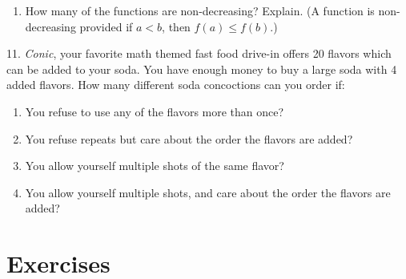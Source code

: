 \documentclass[10pt,]{book}
\theoremstyle{plain}
\theoremstyle{definition}
\numberwithin{equation}{chapter}
\newcommand{\lt}{ < }
\begin{document}
\begin{exerciselist}
\begin{enumerate}[label=(\alph*)]
\item\hypertarget{li-345}{}
              How many of the functions are non-decreasing? Explain. (A function is non-decreasing provided if \(a \lt  b\), then \(f(a) \le f(b)\).)


\end{enumerate}

\par\smallskip
\item[11.]\hypertarget{exercise-105}{}
                \emph{Conic}, your favorite math themed fast food drive-in offers 20 flavors which can be added to your soda. You have enough money to buy a large soda with 4 added flavors. How many different soda concoctions can you order if:
            \leavevmode%
\begin{enumerate}[label=(\alph*)]
\item\hypertarget{li-346}{}
                        You refuse to use any of the flavors more than once?
\item\hypertarget{li-347}{}
                        You refuse repeats but care about the order the flavors are added?
\item\hypertarget{li-348}{}
                        You allow yourself multiple shots of the same flavor?
\item\hypertarget{li-349}{}
                        You allow yourself multiple shots, and care about the order the flavors are added?
\end{enumerate}

\par\smallskip
\end{exerciselist}
\typeout{************************************************}
\typeout{************************************************}
\section[Exercises]{Exercises}\label{section-10}
\typeout{************************************************}
\typeout{************************************************}
\end{document}
